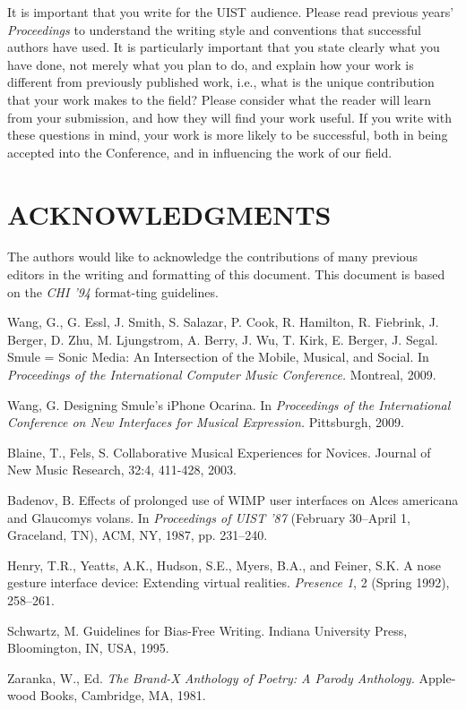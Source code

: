 \documentclass{article}
\begin{document}
It is important that you write for the UIST audience.  Please read previous years’
{\em Proceedings} to understand the writing style and conventions that successful 
authors have used.  It is particularly important that you state clearly what you 
have done, not merely what you plan to do, and explain how your work is
different from previously published work, i.e., what is the unique contribution
that your work makes to the field?  Please consider what the reader will learn
from your submission, and how they will find your work useful.  If you write with
these questions in mind, your work is more likely to be successful, both in being
accepted into the Conference, and in influencing the work of our field.




\section{ACKNOWLEDGMENTS}

The authors would like to acknowledge the contributions of many previous
editors in the writing and formatting of this document.  This document is based on
the {\em CHI '94} format-ting guidelines.

\begin{thebibliography}{9}

 Wang, G., G. Essl, J. Smith, S. Salazar, P. Cook, R. Hamilton, R. Fiebrink, J. Berger, D. Zhu, M. Ljungstrom, A. Berry, J. Wu, T. Kirk, E. Berger, J. Segal. Smule = Sonic Media: An Intersection of the Mobile, Musical, and Social.
In {\em Proceedings of the International Computer Music Conference.}
Montreal, 2009.

 Wang, G. Designing Smule’s iPhone Ocarina.
In {\em Proceedings of the International Conference on New Interfaces for Musical Expression.}
Pittsburgh, 2009.

 Blaine, T., Fels, S. Collaborative Musical Experiences for Novices.
Journal of New Music Research, 32:4, 411-428, 2003.

  Badenov, B. Effects of prolonged use of WIMP user
interfaces on Alces americana and Glaucomys volans.
In {\em Proceedings of UIST '87}
(February 30--April 1, Graceland, TN), ACM, NY, 1987, pp. 231--240.

 Henry, T.R., Yeatts, A.K., Hudson, S.E., Myers, B.A.,
and Feiner, S.K.  A nose gesture interface device: Extending virtual realities.
{\em Presence 1}, 2 (Spring 1992), 258--261.

 Schwartz, M. Guidelines for Bias-Free Writing.
Indiana University Press, Bloomington, IN, USA, 1995.

 Zaranka, W., Ed. {\em The Brand-X Anthology of Poetry:  A
Parody Anthology.}  Apple-wood Books, Cambridge, MA, 1981.
\end{thebibliography}
\end{document}
